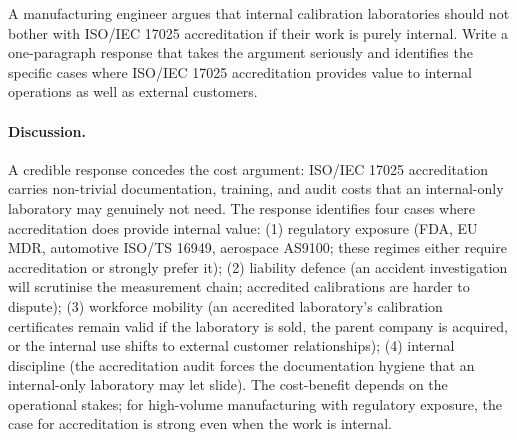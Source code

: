 \begin{exercise}
A manufacturing engineer argues that internal calibration
laboratories should not bother with ISO/IEC 17025 accreditation if
their work is purely internal. Write a one-paragraph response that
takes the argument seriously and identifies the specific cases
where ISO/IEC 17025 accreditation provides value to internal
operations as well as external customers.

\paragraph{Discussion.} A credible response concedes the cost
argument: ISO/IEC 17025 accreditation carries non-trivial
documentation, training, and audit costs that an internal-only
laboratory may genuinely not need. The response identifies four
cases where accreditation does provide internal value: (1)
regulatory exposure (FDA, EU MDR, automotive ISO/TS 16949,
aerospace AS9100; these regimes either require accreditation or
strongly prefer it); (2) liability defence (an accident
investigation will scrutinise the measurement chain; accredited
calibrations are harder to dispute); (3) workforce mobility (an
accredited laboratory's calibration certificates remain valid if
the laboratory is sold, the parent company is acquired, or the
internal use shifts to external customer relationships); (4)
internal discipline (the accreditation audit forces the
documentation hygiene that an internal-only laboratory may let
slide). The cost-benefit depends on the operational stakes; for
high-volume manufacturing with regulatory exposure, the case for
accreditation is strong even when the work is internal.
\end{exercise}

